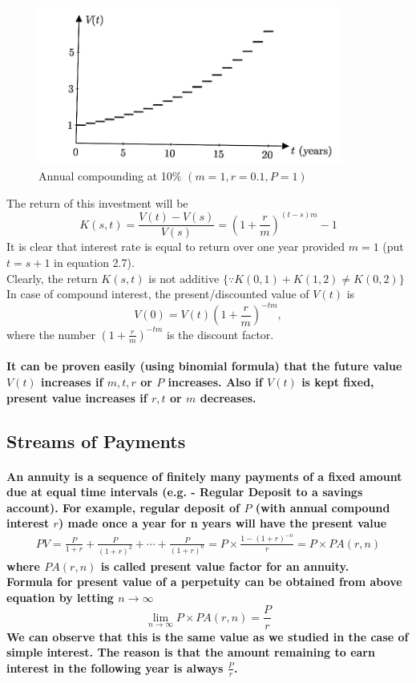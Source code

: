 \begin{figure}[htp]
    \centering
    \includegraphics[width=10cm]{2.jpg}
    \caption{Annual compounding at 10\% $(m=1,r=0.1,P=1)$ }
    \label{fig:CI}
\end{figure}
The return of this investment will be 
\begin{equation} 
K(s,t)=\frac{V(t)-V(s)}{V(s)}=(1+\frac{r}{m})^{(t-s)m}-1 
\end{equation}
It is clear that interest rate is equal to return over one year provided $m=1$ (put $t=s+1$ in equation 2.7).
\\Clearly, the return $K(s,t)$ is not additive $\{\because K(0,1)+K(1,2)\neq K(0,2)\}$
\\In case of compound interest, the present/discounted value of $V(t)$ is
\begin{equation}
    V(0)=V(t) (1+\frac{r}{m})^{-tm},
\end{equation}
where the number $(1+\frac{r}{m})^{-tm}$ is the discount factor.
\paragraph{It can be proven easily (using binomial formula) that the future value $V(t)$ increases if $m,t,r$ or $P$ increases. Also if $V(t)$ is kept fixed, present value increases if $r,t$ or $m$ decreases.}

\subsection{Streams of Payments}
\paragraph{An annuity is a sequence of finitely many payments of a fixed amount due at equal time intervals (e.g. - Regular Deposit to a savings account). For example, regular deposit of $P$ (with annual compound interest $r$) made once a year for n years will have the present value \-
\[\begin{split}
        PV=\frac{P}{1+r}+\frac{P}{(1+r)^{2}}+\cdots+\frac{P}{(1+r)^{n}}
        = P \times \frac{1-(1+r)^{-n}}{r}
        = P \times PA(r,n)
\end{split}\]
where $PA(r,n)$ is called present value factor for an annuity.
\\Formula for present value of a perpetuity can be obtained from above equation by letting $n\to\infty$ 
\[\displaystyle \lim_{n\to\infty} P \times PA(r,n) = \frac{P}{r}\]
We can observe that this is the same value as we studied in the case of simple interest. The reason is that the amount remaining to earn interest in the following year is always $\frac{P}{r}$. 
}

